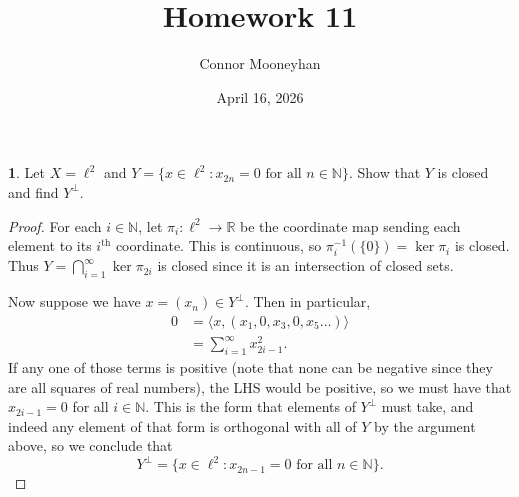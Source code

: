 \documentclass[12pt]{article}
\title{Homework 11}
\author{Connor Mooneyhan}
\date{April 16, 2026}
\theoremstyle{definition}
\newtheorem{ex}{}
\begin{document}
\maketitle

\begin{ex}
	Let $X = \ell^2$ and $Y = \lbrace x \in \ell^2 : x_{2n} = 0 \text{ for all } n \in \mathbb{N} \rbrace$.
	Show that $Y$ is closed and find $Y^\perp$.
\end{ex}
\begin{proof}
	For each $i \in \mathbb{N}$, let $\pi_i : \ell^2 \to \mathbb{R}$ be the coordinate map sending each element to its $i^{\text{th}}$ coordinate.
	This is continuous, so $\pi_i^{-1}(\lbrace 0 \rbrace) = \ker\pi_i$ is closed.
	Thus $Y = \bigcap_{i=1}^\infty \ker\pi_{2i}$ is closed since it is an intersection of closed sets.

	Now suppose we have $x = (x_n) \in Y^\perp$.
	Then in particular, \begin{align*}
		0 & = \langle x, (x_1, 0, x_3, 0, x_5 \dots) \rangle \\
		  & = \sum_{i=1}^\infty x_{2i-1}^2.
	\end{align*}
	If any one of those terms is positive (note that none can be negative since they are all squares of real numbers), the LHS would be positive, so we must have that $x_{2i-1} = 0$ for all $i \in \mathbb{N}$.
	This is the form that elements of $Y^\perp$ must take, and indeed any element of that form is orthogonal with all of $Y$ by the argument above, so we conclude that \begin{equation*}
		Y^\perp = \lbrace x \in \ell^2 : x_{2n-1} = 0 \text{ for all } n \in \mathbb{N} \rbrace.
	\end{equation*}
\end{proof}
\end{document}
